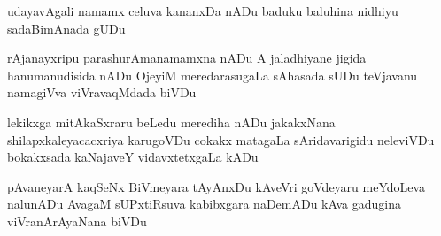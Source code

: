 \documentclass{article}
\begin{document}
\obeylines
{\LARGE
\begin{flushleft}	
udayavAgali namamx celuva kananxDa nADu
baduku baluhina nidhiyu sadaBimAnada gUDu
\end{flushleft}	

\smallskip
\begin{flushright}
rAjanayxripu parashurAmanamamxna nADu
A jaladhiyane jigida hanumanudisida nADu
OjeyiM meredarasugaLa sAhasada sUDu
teVjavanu namagiVva viVravaqMdada biVDu
\end{flushright}

\smallskip
\begin{flushleft}
lekikxga mitAkaSxraru beLedu merediha nADu
jakakxNana shilapxkaleyacacxriya karugoVDu
cokakx matagaLa sAridavarigidu neleviVDu
bokakxsada kaNajaveY vidavxtetxgaLa kADu
\end{flushleft}

\smallskip
\begin{flushright}
pAvaneyarA kaqSeNx BiVmeyara tAyAnxDu
kAveVri goVdeyaru meYdoLeva nalunADu
AvagaM sUPxtiRsuva kabibxgara naDemADu
kAva gadugina viVranArAyaNana biVDu
\end{flushright}}
\bigskip

\end{document}
